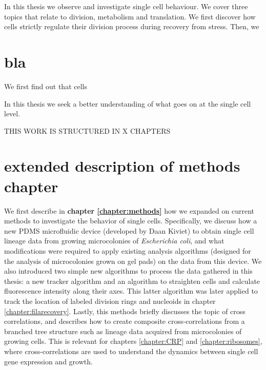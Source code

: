 


In this thesis we observe and investigate single cell behaviour.  
%
We cover three topics that relate to division, metabolism and translation.
%
We first discover how cells strictly regulate their division process during recovery from stress.
%
Then, we 

\section{bla}

We first find out that cells 



In this thesis we seek a better understanding of what goes on at the single cell level.


THIS WORK IS STRUCTURED IN X CHAPTERS


\section{extended description of methods chapter}
We first describe in \textbf{chapter \ref{chapter:methods}} how we expanded on current methods to investigate the behavior of single cells.
%
Specifically, we discuss how a new PDMS microfluidic device (developed by Daan Kiviet) to obtain single cell lineage data from growing microcolonies of \textit{Escherichia coli}, and what modifications were required to apply existing analysis algorithms (designed for the analysis of microcolonies grown on gel pads) on the data from this device.
%
We also introduced two simple new algorithms to process the data gathered in this thesis:
a new tracker algorithm and an algorithm to straighten cells and calculate fluorescence intensity along their axes. 
This latter algorithm was later applied to track the location of labeled division rings and nucleoids in chapter \ref{chapter:filarecovery}.
%
Lastly, this methods briefly discusses the topic of cross correlations,
and describes how to create composite cross-correlations from a branched tree structure such as lineage data acquired from microcolonies of growing cells.
%
This is relevant for chapters \ref{chapter:CRP} and \ref{chapter:ribosomes}, where cross-correlations are used to understand the dynamics between 
single cell gene expression and growth.











